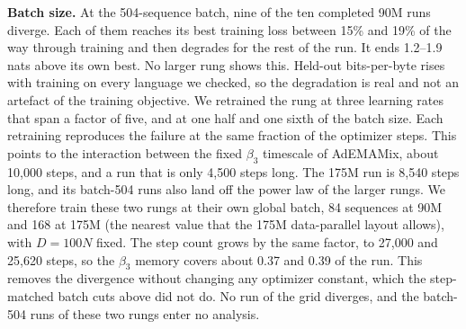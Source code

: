 \textbf{Batch size.} At the 504-sequence batch, nine of the ten completed 90M runs diverge. Each of them reaches its best training loss between 15\% and 19\% of the way through training and then degrades for the rest of the run. It ends 1.2--1.9 nats above its own best. No larger rung shows this. Held-out bits-per-byte rises with training on every language we checked, so the degradation is real and not an artefact of the training objective. We retrained the rung at three learning rates that span a factor of five, and at one half and one sixth of the batch size. Each retraining reproduces the failure at the same fraction of the optimizer steps. This points to the interaction between the fixed $\beta_3$ timescale of AdEMAMix, about 10,000 steps, and a run that is only 4,500 steps long. The 175M run is 8,540 steps long, and its batch-504 runs also land off the power law of the larger rungs. We therefore train these two rungs at their own global batch, 84 sequences at 90M and 168 at 175M (the nearest value that the 175M data-parallel layout allows), with $D = 100N$ fixed. The step count grows by the same factor, to 27,000 and 25,620 steps, so the $\beta_3$ memory covers about 0.37 and 0.39 of the run. This removes the divergence without changing any optimizer constant, which the step-matched batch cuts above did not do. No run of the grid diverges, and the batch-504 runs of these two rungs enter no analysis.

